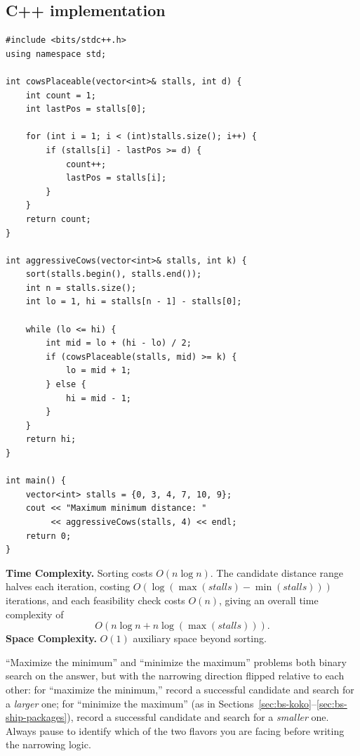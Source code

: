 \subsection*{C++ implementation}

\begin{lstlisting}
#include <bits/stdc++.h>
using namespace std;

int cowsPlaceable(vector<int>& stalls, int d) {
    int count = 1;
    int lastPos = stalls[0];

    for (int i = 1; i < (int)stalls.size(); i++) {
        if (stalls[i] - lastPos >= d) {
            count++;
            lastPos = stalls[i];
        }
    }
    return count;
}

int aggressiveCows(vector<int>& stalls, int k) {
    sort(stalls.begin(), stalls.end());
    int n = stalls.size();
    int lo = 1, hi = stalls[n - 1] - stalls[0];

    while (lo <= hi) {
        int mid = lo + (hi - lo) / 2;
        if (cowsPlaceable(stalls, mid) >= k) {
            lo = mid + 1;
        } else {
            hi = mid - 1;
        }
    }
    return hi;
}

int main() {
    vector<int> stalls = {0, 3, 4, 7, 10, 9};
    cout << "Maximum minimum distance: "
         << aggressiveCows(stalls, 4) << endl;
    return 0;
}
\end{lstlisting}

\begin{complexitybox}
\textbf{Time Complexity.} Sorting costs $O(n \log n)$. The candidate
distance range halves each iteration, costing
$O(\log(\max(\textit{stalls})-\min(\textit{stalls})))$ iterations, and
each feasibility check costs $O(n)$, giving an overall time complexity of
\[
  O(n \log n + n \log(\max(\textit{stalls}))).
\]
\textbf{Space Complexity.} $O(1)$ auxiliary space beyond sorting.
\end{complexitybox}

\begin{takeawaybox}
``Maximize the minimum'' and ``minimize the maximum'' problems both binary
search on the answer, but with the narrowing direction flipped relative to
each other: for ``maximize the minimum,'' record a successful candidate
and search for a \emph{larger} one; for ``minimize the maximum'' (as in
Sections~\ref{sec:bs-koko}--\ref{sec:bs-ship-packages}), record a
successful candidate and search for a \emph{smaller} one. Always pause to
identify which of the two flavors you are facing before writing the
narrowing logic.
\end{takeawaybox}
